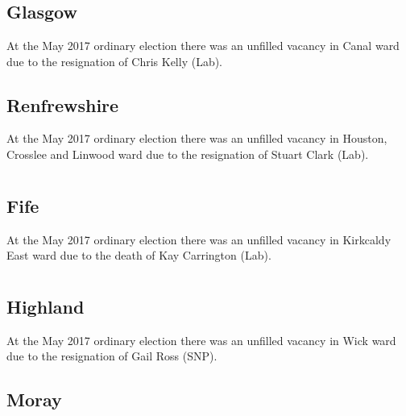 \documentclass[a4paper,openany]{book}
\begin{document}
\begin{resultsiii}
\section[Clyde Councils]{}

\subsection*{Glasgow}

At the May 2017 ordinary election there was an unfilled vacancy in Canal ward due to the resignation of Chris Kelly (Lab).

\subsection*{Renfrewshire}

At the May 2017 ordinary election there was an unfilled vacancy in Houston, Crosslee and Linwood ward due to the resignation of Stuart Clark (Lab).

\section[Forth Councils]{}

\subsection*{Fife}

At the May 2017 ordinary election there was an unfilled vacancy in Kirkcaldy East ward due to the death of Kay Carrington (Lab).

\section[Highland Councils]{}

\subsection*{Highland}

At the May 2017 ordinary election there was an unfilled vacancy in Wick ward due to the resignation of Gail Ross (SNP).

\subsection*{Moray}


\end{resultsiii}
\end{document}

